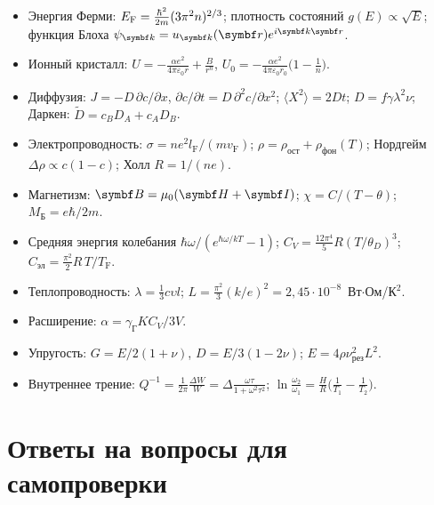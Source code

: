\begin{itogi}
\begin{itemize}
\item Энергия Ферми: $E_{\mathrm{F}}=\frac{\hbar^2}{2m}(3\pi^2n)^{2/3}$; плотность состояний
$g(E)\propto\sqrt E$; функция Блоха $\psi_{\vb k}=u_{\vb k}(\vb r)e^{i\vb k\vb r}$.
\item Ионный кристалл: $U=-\frac{\alpha e^2}{4\pi\varepsilon_0r}+\frac B{r^n}$,
$U_0=-\frac{\alpha e^2}{4\pi\varepsilon_0r_0}\bigl(1-\frac1n\bigr)$.
\item Диффузия: $J=-D\,\partial c/\partial x$, $\partial c/\partial t=D\,\partial^2c/\partial x^2$;
$\langle X^2\rangle=2Dt$; $D=f\gamma\lambda^2\nu$; Даркен: $\tilde D=c_BD_A+c_AD_B$.
\item Электропроводность: $\sigma=ne^2l_\text{F}/(mv_\text{F})$;
$\rho=\rho_\text{ост}+\rho_\text{фон}(T)$; Нордгейм $\Delta\rho\propto c(1-c)$; Холл $R=1/(ne)$.
\item Магнетизм: $\vb B=\mu_0(\vb H+\vb I)$; $\chi=C/(T-\theta)$; $M_\text{Б}=e\hbar/2m$.
\item Средняя энергия колебания $\hbar\omega/(e^{\hbar\omega/kT}-1)$;
$C_V=\frac{12\pi^4}{5}R(T/\theta_D)^3$; $C_\text{эл}=\frac{\pi^2}2R\,T/T_\text{F}$.
\item Теплопроводность: $\lambda=\frac13c\upsilon l$; $L=\frac{\pi^2}3(k/e)^2=2{,}45\cdot10^{-8}$~Вт$\cdot$Ом/К$^2$.
\item Расширение: $\alpha=\gamma_\text{Г}KC_V/3V$.
\item Упругость: $G=E/2(1+\nu)$, $D=E/3(1-2\nu)$; $E=4\rho\nu_\text{рез}^2L^2$.
\item Внутреннее трение: $Q^{-1}=\frac1{2\pi}\frac{\Delta W}W=\Delta\frac{\omega\tau}{1+\omega^2\tau^2}$;
$\ln\frac{\omega_2}{\omega_1}=\frac HR\bigl(\frac1{T_1}-\frac1{T_2}\bigr)$.
\end{itemize}
\end{itogi}

\section*{Ответы на вопросы для самопроверки}

